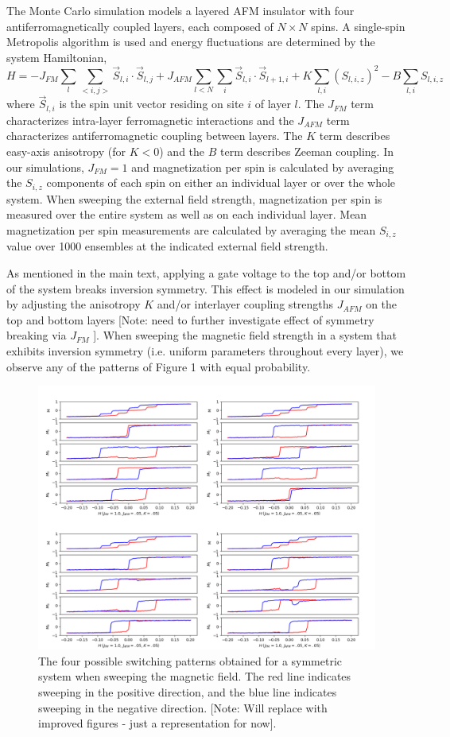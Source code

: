 \documentclass[10pt]{article}
\begin{document}
The Monte Carlo simulation models a layered AFM insulator with four antiferromagnetically coupled layers, each composed of $N \times N$ spins. A single-spin Metropolis algorithm is used and energy
fluctuations are determined by the system Hamiltonian,
$$H = -J_{FM}\sum_{l}\sum_{<i,j>}\vec{S}_{l,i}\cdot \vec{S}_{l,j} + J_{AFM}\sum_{l < N}\sum_{i}\vec{S}_{l,i} \cdot \vec{S}_{l+1,i} + K\sum_{l,i}\left (S_{l,i,z}\right )^{2} - B \sum_{l,i}S_{l,i,z}$$
where $\vec{S}_{l,i}$ is the spin unit vector residing on site $i$ of layer $l$. The $J_{FM}$ term characterizes intra-layer
ferromagnetic interactions and the $J_{AFM}$ term characterizes antiferromagnetic coupling between layers. The $K$ term describes
easy-axis anisotropy (for $K < 0$) and the $B$ term describes Zeeman coupling.
In our simulations, $J_{FM} = 1$ and magnetization per spin is calculated by averaging the $S_{i,z}$ components of each spin on either an individual layer or over the whole system.
When sweeping the external field strength, magnetization per spin is measured over the entire system as well as on each individual layer. Mean magnetization per spin measurements
are calculated by averaging the mean $S_{i,z}$ value over 1000 ensembles at the indicated external field strength.

As mentioned in the main text, applying a gate voltage to the top and/or bottom of the system breaks inversion symmetry. This effect is modeled in our simulation by adjusting the anisotropy $K$ and/or interlayer
coupling strengths $J_{AFM}$ on the top and bottom layers [Note: need to further investigate effect of symmetry breaking via $J_{FM}$ ]. When sweeping the magnetic field strength in a system that exhibits
inversion symmetry (i.e. uniform parameters throughout every layer), we observe any of the patterns of Figure 1 with equal probability.

\begin{figure}[!htb]
\includegraphics[width=\textwidth]{4_patterns.png}
\caption{The four possible switching patterns obtained for a symmetric system when sweeping the magnetic field. The red line indicates sweeping in the positive direction, and the blue line indicates
sweeping in the negative direction. [Note: Will replace with improved figures - just a representation for now]. }
\end{figure}
\end{document}
